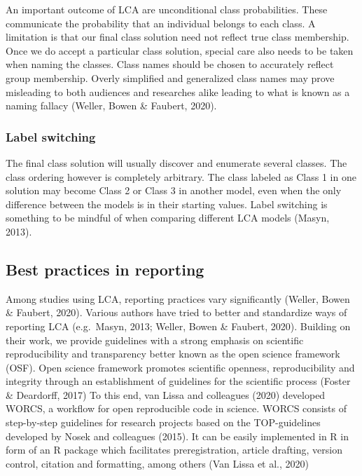 \documentclass[
  ,man]{apa6}
\begin{document}
An important outcome of LCA are unconditional class probabilities.
These communicate the probability that an individual belongs to each class.
A limitation is that our final class solution need not reflect true class membership.
Once we do accept a particular class solution, special care also needs to be taken when naming the classes.
Class names should be chosen to accurately reflect group membership.
Overly simplified and generalized class names may prove misleading to both audiences and researches alike
leading to what is known as a naming fallacy (Weller, Bowen \& Faubert, 2020).

\hypertarget{label-switching}{%
\subsubsection{Label switching}\label{label-switching}}

The final class solution will usually discover and enumerate several classes.
The class ordering however is completely arbitrary.
The class labeled as Class 1 in one solution may become Class 2 or Class 3 in another model,
even when the only difference between the models is in their starting values.
Label switching is something to be mindful of when comparing different LCA models (Masyn, 2013).

\hypertarget{best-practices-in-reporting}{%
\subsection{Best practices in reporting}\label{best-practices-in-reporting}}

Among studies using LCA, reporting practices vary significantly (Weller, Bowen \& Faubert, 2020).
Various authors have tried to better and standardize ways of reporting LCA (e.g.~Masyn, 2013; Weller, Bowen \& Faubert, 2020).
Building on their work, we provide guidelines with a strong emphasis on scientific reproducibility and transparency
better known as the open science framework (OSF). Open science framework promotes scientific openness, reproducibility and integrity
through an establishment of guidelines for the scientific process (Foster \& Deardorff, 2017)
To this end, van Lissa and colleagues (2020) developed WORCS, a workflow for open reproducible code in science.
WORCS consists of step-by-step guidelines for research projects based on the TOP-guidelines developed by Nosek and colleagues (2015).
It can be easily implemented in R in form of an R package which facilitates preregistration, article drafting,
version control, citation and formatting, among others (Van Lissa et al., 2020)
\end{document}
